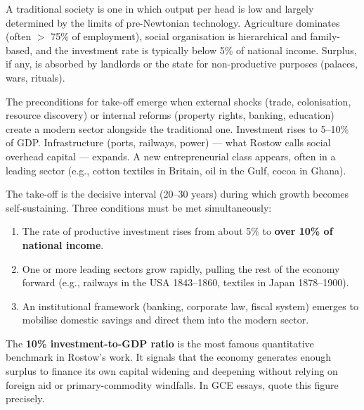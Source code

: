\documentclass[11pt]{article}
\newcommand{\cle}[1]{{\popxbold\color{popdark}#1}}
\begin{document}
\begin{definition}
A \cle{traditional society} is one in which output per head is low and largely determined by the limits of pre-Newtonian technology. Agriculture dominates (often $>$ 75\% of employment), social organisation is hierarchical and family-based, and the investment rate is typically below 5\% of national income. Surplus, if any, is absorbed by landlords or the state for non-productive purposes (palaces, wars, rituals).
\end{definition}

\begin{definition}
The \cle{preconditions for take-off} emerge when external shocks (trade, colonisation, resource discovery) or internal reforms (property rights, banking, education) create a modern sector alongside the traditional one. Investment rises to 5–10\% of GDP. Infrastructure (ports, railways, power) — what Rostow calls \cle{social overhead capital} — expands. A new entrepreneurial class appears, often in a \cle{leading sector} (e.g., cotton textiles in Britain, oil in the Gulf, cocoa in Ghana).
\end{definition}

\begin{definition}
The \cle{take-off} is the decisive interval (20–30 years) during which growth becomes self-sustaining. Three conditions must be met simultaneously:
\begin{enumerate}
  \item The rate of productive investment rises from about 5\% to \textbf{over 10\% of national income}.
  \item One or more \cle{leading sectors} grow rapidly, pulling the rest of the economy forward (e.g., railways in the USA 1843–1860, textiles in Japan 1878–1900).
  \item An institutional framework (banking, corporate law, fiscal system) emerges to mobilise domestic savings and direct them into the modern sector.
\end{enumerate}
\end{definition}

\begin{aretenir}
The \textbf{10\% investment-to-GDP ratio} is the most famous quantitative benchmark in Rostow's work. It signals that the economy generates enough surplus to finance its own capital widening and deepening without relying on foreign aid or primary-commodity windfalls. In GCE essays, quote this figure precisely.
\end{aretenir}
\end{document}
